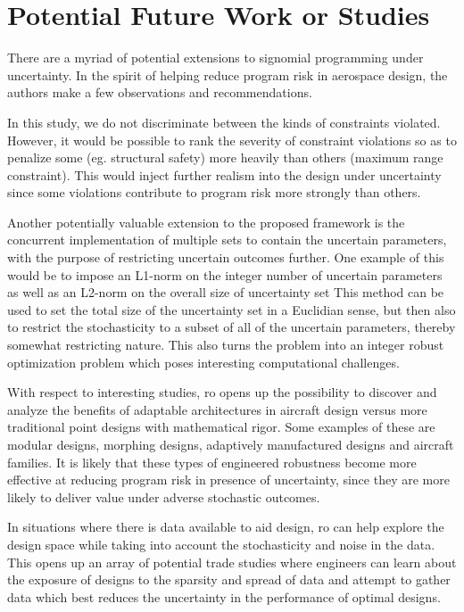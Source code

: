 \section{Potential Future Work or Studies}

There are a myriad of potential extensions to signomial programming under uncertainty.
In the spirit of helping reduce program risk in aerospace design,
the authors make a few observations and recommendations.

In this study, we do not discriminate between the kinds of constraints violated. However, it would
be possible to rank the severity of constraint violations so as to penalize some (eg. structural safety)
more heavily than others (maximum range constraint). This would inject further realism into the
design under uncertainty since some violations contribute to program risk more
strongly than others.

Another potentially valuable extension to the proposed framework is the concurrent implementation
of multiple sets to contain the uncertain parameters, with the purpose of restricting uncertain
outcomes further. One example of this would be to impose an  L1-norm on the integer number of uncertain parameters
as well as an L2-norm on the overall size of uncertainty set
This method can be used to set the total size of the uncertainty set in a Euclidian sense,
but then also to restrict the stochasticity to a subset of all of the uncertain parameters,
thereby somewhat restricting nature. This also turns the problem into an integer robust
optimization problem which poses interesting computational challenges.

With respect to interesting studies, \gls{ro} opens up the possibility to discover and analyze the benefits
of adaptable architectures in aircraft design versus more traditional point designs
with mathematical rigor. Some examples of these are modular designs, morphing designs,
adaptively manufactured designs and aircraft families. It is likely that these types of engineered
robustness become more effective at reducing program risk
in presence of uncertainty, since they are more likely
to deliver value under adverse stochastic outcomes.

In situations where there is data available to aid design, \gls{ro} can help explore
the design space while taking into account the stochasticity and noise in the data.
This opens up an array of potential trade studies where engineers can learn about
the exposure of designs to the sparsity and spread of data and attempt to gather
data which best reduces the uncertainty in the performance of optimal designs.
